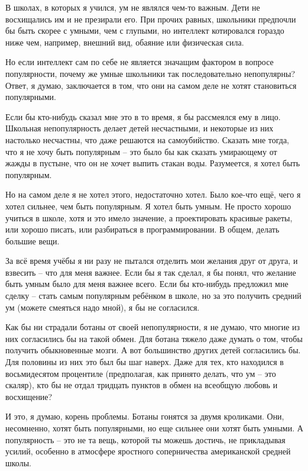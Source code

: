 \documentclass[ebook,12pt,oneside,openany]{memoir}
\begin{document}
В школах, в которых я учился, ум не являлся чем-то важным. Дети не
восхищались им и не презирали его. При прочих равных, школьники
предпочли бы быть скорее с умными, чем с глупыми, но интеллект
котировался гораздо ниже чем, например, внешний вид, обаяние или
физическая сила.

Но если интеллект сам по себе не является значащим фактором в вопросе
популярности, почему же умные школьники так последовательно
непопулярны? Ответ, я думаю, заключается в том, что они на самом деле
не хотят становиться популярными.

Если бы кто-нибудь сказал мне это в то время, я бы рассмеялся ему в
лицо. Школьная непопулярность делает детей несчастными, и некоторые из
них настолько несчастны, что даже решаются на самоубийство. Сказать
мне тогда, что я не хочу быть популярным – это было бы как сказать
умирающему от жажды в пустыне, что он не хочет выпить стакан воды.
Разумеется, я хотел быть популярным.

Но на самом деле я не хотел этого, недостаточно хотел. Было кое-что
ещё, чего я хотел сильнее, чем быть популярным. Я хотел быть умным. Не
просто хорошо учиться в школе, хотя и это имело значение, а
проектировать красивые ракеты, или хорошо писать, или разбираться в
программировании. В общем, делать большие вещи.

За всё время учёбы я ни разу не пытался отделить мои желания друг от
друга, и взвесить – что для меня важнее. Если бы я так сделал, я бы
понял, что желание быть умным было для меня важнее всего. Если бы
кто-нибудь предложил мне сделку – стать самым популярным ребёнком в
школе, но за это получить средний ум (можете смеяться надо мной), я бы
не согласился.

Как бы ни страдали ботаны от своей непопулярности, я не думаю, что
многие из них согласились бы на такой обмен. Для ботана тяжело даже
думать о том, чтобы получить обыкновенные мозги. А вот большинство
других детей согласились бы. Для половины из них это был бы шаг
наверх. Даже для тех, кто находился в восьмидесятом процентиле
(предполагая, как принято делать, что ум – это скаляр), кто бы не
отдал тридцать пунктов в обмен на всеобщую любовь и восхищение?

И это, я думаю, корень проблемы. Ботаны гонятся за двумя кроликами.
Они, несомненно, хотят быть популярными, но еще сильнее они хотят быть
умными. А популярность – это не та вещь, которой ты можешь достичь, не
прикладывая усилий, особенно в атмосфере яростного соперничества
американской средней школы.
\end{document}
